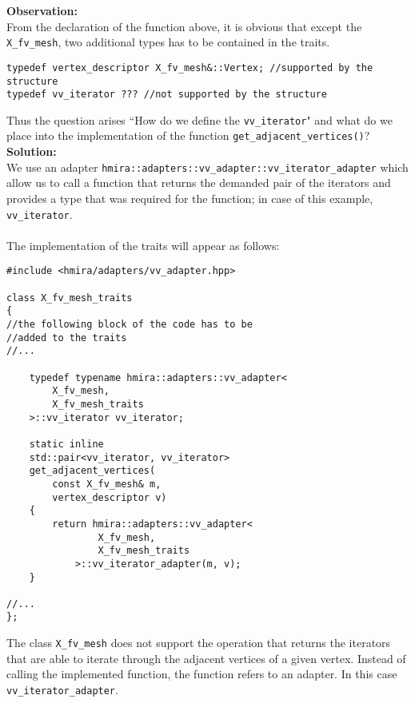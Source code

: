 \textbf{Observation:}\\
From the declaration of the function above, it is obvious that except the \texttt{X\_fv\_mesh},
two additional types has to be contained in the traits.

\begin{lstlisting}
typedef vertex_descriptor X_fv_mesh&::Vertex; //supported by the structure
typedef vv_iterator ??? //not supported by the structure
\end{lstlisting}

Thus the question arises ``How do we define the \texttt{vv\_iterator}" and what do we
place into the implementation of the function \texttt{get\_adjacent\_vertices()}?\\

\textbf{Solution:}\\
We use an adapter \texttt{hmira::adapters::vv\_adapter::vv\_iterator\_adapter} which allow us to
call a function that returns the demanded pair of the iterators and provides a type
that was required for the function; in case of this example, \texttt{vv\_iterator}.\\
\\
The implementation of the traits will appear as follows:
\nopagebreak

\begin{lstlisting}
#include <hmira/adapters/vv_adapter.hpp>

class X_fv_mesh_traits
{
//the following block of the code has to be
//added to the traits
//...

	typedef typename hmira::adapters::vv_adapter<
		X_fv_mesh,
		X_fv_mesh_traits
	>::vv_iterator vv_iterator;

	static inline
	std::pair<vv_iterator, vv_iterator>
	get_adjacent_vertices(
		const X_fv_mesh& m,
		vertex_descriptor v)
	{
		return hmira::adapters::vv_adapter<
				X_fv_mesh,
				X_fv_mesh_traits
			>::vv_iterator_adapter(m, v);
	}

//...
};
\end{lstlisting}
The class \texttt{X\_fv\_mesh} does not support the operation that returns the iterators
that are able to iterate through the adjacent vertices of a given vertex. Instead of calling
the implemented function, the function refers to an adapter. In this case \texttt{vv\_iterator\_adapter}.







